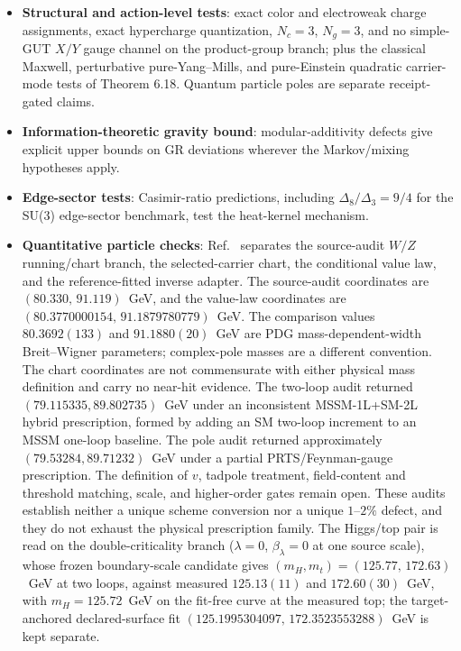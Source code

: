 \begin{itemize}
\tightlist
\item \textbf{Structural and action-level tests}: exact color and electroweak charge assignments,
exact hypercharge quantization, \(N_c=3\), \(N_g=3\), and no simple-GUT \(X/Y\) gauge channel on the
product-group branch; plus the classical Maxwell, perturbative pure-Yang--Mills, and pure-Einstein
quadratic carrier-mode tests of Theorem 6.18. Quantum particle poles are separate receipt-gated
claims.
\item \textbf{Information-theoretic gravity bound}: modular-additivity defects give explicit
upper bounds on GR deviations wherever the Markov/mixing hypotheses apply.
\item \textbf{Edge-sector tests}: Casimir-ratio predictions, including
\(\Delta_8/\Delta_3=9/4\) for the SU(3) edge-sector benchmark, test the heat-kernel mechanism.
\item \textbf{Quantitative particle checks}: Ref.~\cite{ophparticles} separates the source-audit
\(W/Z\) running/chart branch, the selected-carrier chart, the conditional value law, and the
reference-fitted inverse adapter. The source-audit coordinates are
\((80.330,\,91.119)\)~GeV, and the value-law coordinates are
\((80.3770000154,\,91.1879780779)\)~GeV. The comparison values
\(80.3692(133)\) and \(91.1880(20)\)~GeV are PDG mass-dependent-width Breit--Wigner
parameters; complex-pole masses are a different convention. The chart coordinates are not
commensurate with either physical mass definition and carry no near-hit evidence.
The two-loop audit returned \((79.115335,89.802735)\)~GeV under an inconsistent
MSSM-1L+SM-2L hybrid prescription, formed by adding an SM two-loop increment to an MSSM
one-loop baseline. The pole audit returned approximately \((79.53284,89.71232)\)~GeV under a
partial PRTS/Feynman-gauge prescription. The definition of \(v\), tadpole treatment,
field-content and threshold matching, scale, and higher-order gates remain open. These audits
establish neither a unique scheme conversion nor a unique \(1\)--\(2\%\) defect, and they do
not exhaust the physical prescription family. The Higgs/top pair is read on the double-criticality branch (\(\lambda=0\),
\(\beta_\lambda=0\) at one source scale), whose frozen boundary-scale candidate gives
\((m_H,m_t)=(125.77,\,172.63)\)~GeV at two loops, against measured \(125.13(11)\) and
\(172.60(30)\)~GeV, with \(m_H=125.72\)~GeV on the fit-free curve at the measured top; the
target-anchored declared-surface fit \((125.1995304097,\,172.3523553288)\)~GeV is kept separate.

\end{itemize}
